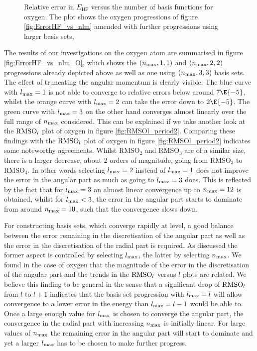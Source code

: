 \begin{figure}
	\centering
	\caption[
		Relative error in $E_\text{HF}$ versus the number of basis functions
		for oxygen
	]{
		Relative error in $E_\text{HF}$ versus the number of basis functions
		for oxygen.
		The plot shows the oxygen progressions of figure \ref{fig:ErrorHF_vs_nlm}
		amended with further progressions using larger basis sets,
	}
	\label{fig:ErrorHF_vs_nlm_O}
\end{figure}
The results of our investigations on the oxygen atom are summarised in figure
\vref{fig:ErrorHF_vs_nlm_O}, which shows
the $(n_\text{max}, 1,1)$ and $(n_\text{max}, 2,2)$ progressions already depicted above
as well as one using $(n_\text{max}, 3,3)$ \CS basis sets.
The effect of truncating the angular momentum is clearly visible.
The blue curve with $l_\text{max} =1$ is not able to converge to relative errors
below around $7\E{-5}$,
whilst the orange curve with $l_\text{max} = 2$ can take the error
down to $2\E{-5}$.
The green curve with $l_\text{max} = 3$ on the other hand
converges almost linearly over the full range of $n_\text{max}$ considered.
This can be explained if we take another look at the
$\text{RMSO}_l$ plot of oxygen in figure \ref{fig:RMSOl_period2}.
Comparing these findings with the $\text{RMSO}_l$ plot of oxygen
in figure \ref{fig:RMSOl_period2} indicates some noteworthy agreements.
Whilst $\text{RMSO}_2$ and $\text{RMSO}_3$ are of a similar size,
there is a larger decrease, about 2 orders of magnitude,
going from $\text{RMSO}_3$ to $\text{RMSO}_4$.
In other words selecting $l_\text{max} = 2$ instead of $l_\text{max} = 1$
does not improve the error in the angular part
as much as going to $l_\text{max} = 3$ does.
This is reflected by the fact that for $l_\text{max} = 3$
an almost linear convergence up to $n_\text{max} = 12$ is obtained,
whilst for $l_\text{max} < 3$, the error in the angular part starts to dominate
from around $n_\text{max} = 10$, such that the convergence slows down.

For constructing \CS basis sets, which converge rapidly at \HF level,
a good balance between the error remaining in the discretisation of the angular
part as well as the error in the discretisation of the radial part is required.
As discussed the former aspect is controlled by selecting $l_\text{max}$,
the latter by selecting $n_\text{max}$.
We found in the case of oxygen that the magnitude of the error
in the discretisation of the angular part and the trends in the $\text{RMSO}_l$ versus $l$
plots are related.
We believe this finding to be general
in the sense that a significant drop of $\text{RMSO}_l$
from $l$ to $l+1$ indicates
that the \CS basis set progression with $l_\text{max} = l$
will allow convergence to a lower error in the \HF energy
than $l_\text{max} = l-1$ would be able to.
Once a large enough value for $l_\text{max}$ is chosen to converge the angular part,
the convergence in the radial part with increasing $n_\text{max}$ is initially linear.
For large values of $n_\text{max}$ the remaining error in the angular part
will start to dominate and yet a larger $l_\text{max}$
has to be chosen to make further progress.

